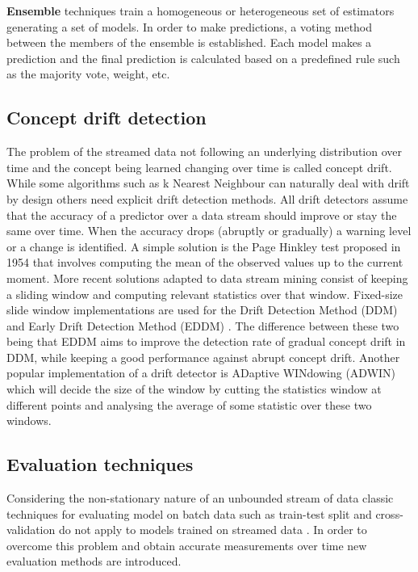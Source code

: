 \documentclass{sig-alternate-br}
\begin{document}
\textbf{Ensemble} techniques train a homogeneous \cite{bifet2012ensembles} or heterogeneous \cite{van2018online} set of estimators generating a set of models. In order to make predictions, a voting method between the members of the ensemble is established. Each model makes a prediction and the final prediction is calculated based on a predefined rule such as the majority vote, weight, etc.

\subsection{Concept drift detection}

The problem of the streamed data not following an underlying distribution over time and the concept being learned changing over time is called concept drift. While some algorithms such as k Nearest Neighbour can naturally deal with drift by design \cite{van2016massively} others need explicit drift detection methods. All drift detectors assume that the accuracy of a predictor over a data stream should improve or stay the same over time. When the accuracy drops (abruptly or gradually) a warning level or a change is identified. A simple solution is the Page Hinkley test proposed in 1954 \cite{page1954continuous} that involves computing the  mean of the observed values up to the current moment. More recent solutions adapted to data stream mining consist of keeping a sliding window and computing relevant statistics over that window. Fixed-size slide window implementations are used for the Drift Detection Method (DDM) \cite{gama2004learning} and Early Drift Detection Method (EDDM) \cite{baena2006early}. The difference between these two being that EDDM aims to improve the detection rate of gradual concept drift in DDM, while keeping a good performance against abrupt concept drift. Another popular implementation of a drift detector is ADaptive WINdowing (ADWIN) \cite{bifet2007learning} which will decide the size of the window by cutting the statistics window at different points and analysing the average of some statistic over these two windows.

\subsection{Evaluation techniques}

Considering the non-stationary nature of an unbounded stream of data classic techniques for evaluating model on batch data such as train-test split and cross-validation do not apply to models trained on streamed data \cite{gama2009issues}. In order to overcome this problem and obtain accurate measurements over time new evaluation methods are introduced. 
\end{document}
